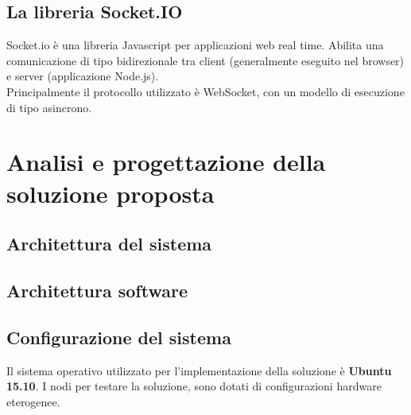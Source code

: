 \documentclass[12pt]{article}
\begin{document}
\subsection{La libreria Socket.IO}

Socket.io è una libreria Javascript per applicazioni web real time. Abilita una comunicazione di tipo bidirezionale tra client (generalmente eseguito nel browser) e server (applicazione Node.js).\\

Principalmente il protocollo utilizzato è WebSocket, con un modello di esecuzione di tipo asincrono.  

\section{Analisi e progettazione della soluzione proposta}
\subsection {Architettura del sistema}

\subsection {Architettura software}

\subsection {Configurazione del sistema}
Il sistema operativo utilizzato per l'implementazione della soluzione è \textbf{Ubuntu 15.10}. I nodi per testare la soluzione, sono dotati di configurazioni hardware eterogenee.
\end{document}
